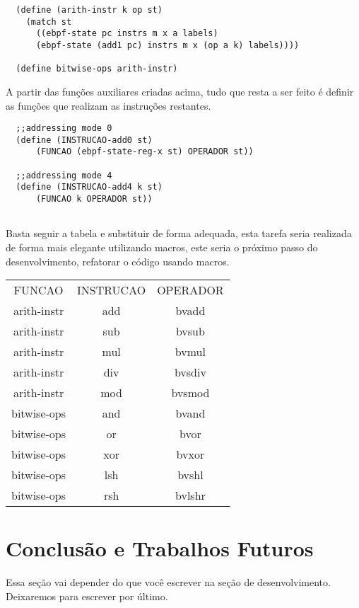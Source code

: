 \documentclass[paper=a4, fontsize=12pt]{article}
\theoremstyle{definition}
\begin{document}
\begin{lstlisting}
  (define (arith-instr k op st)
    (match st
      ((ebpf-state pc instrs m x a labels)
      (ebpf-state (add1 pc) instrs m x (op a k) labels))))

  (define bitwise-ops arith-instr)
\end{lstlisting}

A partir das funções auxiliares criadas acima, tudo que resta a ser feito é definir as funções que realizam as 
instruções restantes.

\begin{lstlisting}
  ;;addressing mode 0
  (define (INSTRUCAO-add0 st)
      (FUNCAO (ebpf-state-reg-x st) OPERADOR st))
  
  ;;addressing mode 4
  (define (INSTRUCAO-add4 k st)
      (FUNCAO k OPERADOR st))
  
\end{lstlisting}

Basta seguir a tabela e substituir de forma adequada, esta tarefa seria realizada de forma mais elegante
utilizando macros, este seria o próximo passo do desenvolvimento, refatorar o código usando macros.

\begin{center}
  \begin{tabular}{ c c c }
    FUNCAO       & INSTRUCAO & OPERADOR\\
    arith-instr  & add       & bvadd\\
    arith-instr  & sub       & bvsub\\
    arith-instr  & mul       & bvmul\\
    arith-instr  & div       & bvsdiv\\
    arith-instr  & mod       & bvsmod\\
    bitwise-ops  & and       & bvand\\
    bitwise-ops  & or        & bvor\\
    bitwise-ops  & xor       & bvxor\\
    bitwise-ops  & lsh       & bvshl\\
    bitwise-ops  & rsh       & bvlshr\\
  \end{tabular}
  \end{center}

\section{Conclusão e Trabalhos Futuros}

Essa seção vai depender do que você escrever na seção de desenvolvimento. Deixaremos
para escrever por último.




\end{document}
